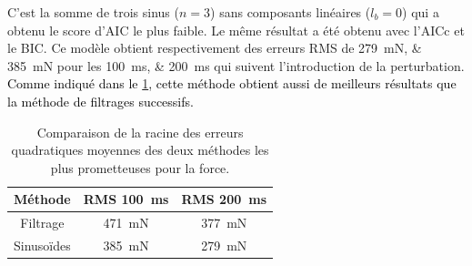 C'est la somme de trois sinus ($n=3$) sans composants linéaires ($l_b=0$) qui a obtenu le score d'AIC le plus faible. Le même résultat a été obtenu avec l'AICc et le BIC. Ce modèle obtient respectivement des erreurs RMS de \SIlist{279;385}{\milli\newton} pour les \SIlist{100;200}{\milli\second} qui suivent l'introduction de la perturbation. \textcolor{black}{Comme indiqué dans le \cref{tab_force_estimation_comparison}, cette méthode obtient aussi de meilleurs résultats que la méthode de filtrages successifs.}

\begin{table}[htbp] 
	\begin{center}
		\begin{tabular}{|c|c|c|}
			\hline  
			Méthode & RMS \SI{100}{\milli\second} & RMS \SI{200}{\milli\second} \\
			\hline
			Filtrage & \SI{471}{\milli\newton} & \SI{377}{\milli\newton} \\
			\hline
			Sinusoïdes & \SI{385}{\milli\newton} & \SI{279}{\milli\newton} \\
			\hline
		\end{tabular}
	\end{center}
	\caption{Comparaison de la racine des erreurs quadratiques moyennes des deux méthodes les plus prometteuses pour la force.}
	\label{tab_force_estimation_comparison}	
\end{table}

%

